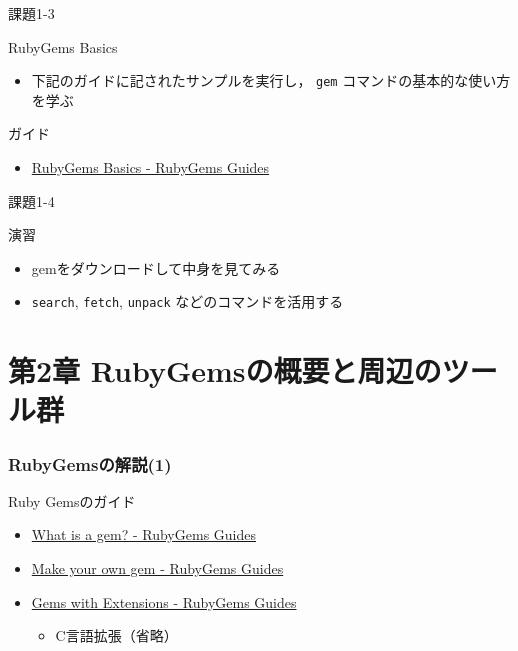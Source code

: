 \documentclass[t, aspectratio=169]{beamer}
\begin{document}
\begin{frame}[fragile,label=sec-1-5-3]{課題1-3}
 \begin{block}{RubyGems Basics}
\begin{itemize}
\item 下記のガイドに記されたサンプルを実行し，
\texttt{gem} コマンドの基本的な使い方を学ぶ
\end{itemize}
\end{block}
\begin{block}{ガイド}
\begin{itemize}
\item \href{http://guides.rubygems.org/rubygems-basics/}{RubyGems Basics - RubyGems Guides}
\end{itemize}
\end{block}
\end{frame}
\begin{frame}[fragile,label=sec-1-5-4]{課題1-4}
 \begin{block}{演習}
\begin{itemize}
\item gemをダウンロードして中身を見てみる
\item \texttt{search}, \texttt{fetch},  \texttt{unpack} などのコマンドを活用する
\end{itemize}
\end{block}
\end{frame}
\part{第2章 RubyGemsの概要と周辺のツール群}
\label{sec-2}
\section{RubyGemsの解説(1)}
\label{sec-2-1}
\begin{frame}[label=sec-2-1-1]{Ruby Gemsのガイド}
\begin{itemize}
\item \href{http://guides.rubygems.org/what-is-a-gem/}{What is a gem? - RubyGems Guides}
\item \href{http://guides.rubygems.org/make-your-own-gem/}{Make your own gem - RubyGems Guides}
\item \href{http://guides.rubygems.org/gems-with-extensions/}{Gems with Extensions - RubyGems Guides}
\begin{itemize}
\item C言語拡張（省略）
\end{itemize}
\end{itemize}
\end{frame}
\end{document}
